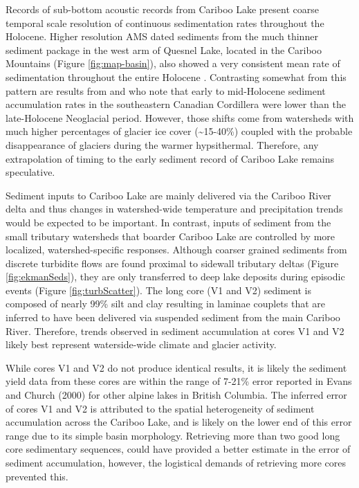 \documentclass[Royal,times,doublespace,sageh]{sagej}
\begin{document}
Records of sub-bottom acoustic records from Cariboo Lake present coarse
temporal scale resolution of continuous sedimentation rates throughout
the Holocene. Higher resolution AMS dated sediments from the much
thinner sediment package in the west arm of Quesnel Lake, located in the
Cariboo Mountains (Figure \ref{fig:map-basin}), also showed a very
consistent mean rate of sedimentation throughout the entire Holocene
\citep{Gilbert2012}. Contrasting somewhat from this pattern are results
from \citet{Menounos2004} and \citet{Desloges1999} who note that early
to mid-Holocene sediment accumulation rates in the southeastern Canadian
Cordillera were lower than the late-Holocene Neoglacial period. However,
those shifts come from watersheds with much higher percentages of
glacier ice cover (\textasciitilde15-40\%) coupled with the probable
disappearance of glaciers during the warmer hypsithermal. Therefore, any
extrapolation of timing to the early sediment record of Cariboo Lake
remains speculative.

Sediment inputs to Cariboo Lake are mainly delivered via the Cariboo
River delta and thus changes in watershed-wide temperature and
precipitation trends would be expected to be important. In contrast,
inputs of sediment from the small tributary watersheds that boarder
Cariboo Lake are controlled by more localized, watershed-specific
responses. Although coarser grained sediments from discrete turbidite
flows are found proximal to sidewall tributary deltas (Figure
\ref{fig:ekmanSeds}), they are only transferred to deep lake deposits
during episodic events (Figure \ref{fig:turbScatter}). The long core (V1
and V2) sediment is composed of nearly 99\% silt and clay resulting in
laminae couplets that are inferred to have been delivered via suspended
sediment from the main Cariboo River. Therefore, trends observed in
sediment accumulation at cores V1 and V2 likely best represent
waterside-wide climate and glacier activity.

While cores V1 and V2 do not produce identical results, it is likely the
sediment yield data from these cores are within the range of 7-21\%
error reported in Evans and Church (2000) for other alpine lakes in
British Columbia. The inferred error of cores V1 and V2 is attributed to
the spatial heterogeneity of sediment accumulation across the Cariboo
Lake, and is likely on the lower end of this error range due to its
simple basin morphology. Retrieving more than two good long core
sedimentary sequences, could have provided a better estimate in the
error of sediment accumulation, however, the logistical demands of
retrieving more cores prevented this.
\end{document}
